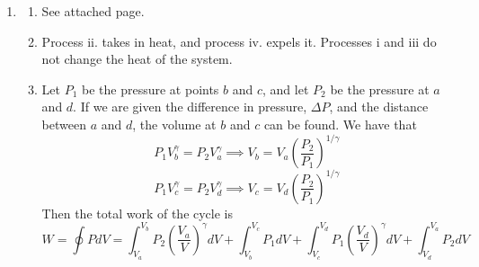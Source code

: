 \documentclass[10pt]{article}
\begin{document}
\begin{enumerate}
    \item \begin{enumerate}
        \item See attached page.

        \item Process ii. takes in heat, and process iv. expels it. Processes i and iii do not change the heat of the system.

        \item Let $P_1$ be the pressure at points $b$ and $c$, and let $P_2$ be the pressure at $a$ and $d$. If we are given the difference in pressure, $\Delta P$, and the distance between $a$ and $d$, the volume at $b$ and $c$ can be found. We have that
        \begin{equation*}
            P_1V_b^\gamma = P_2V_a^\gamma \implies V_b = V_a\left(\frac{P_2}{P_1}\right)^{1/\gamma}
        \end{equation*}
        \begin{equation*}
            P_1V_c^\gamma = P_2V_d^\gamma \implies V_c = V_d\left(\frac{P_2}{P_1}\right)^{1/\gamma}
        \end{equation*}
        Then the total work of the cycle is
        \begin{equation*}
            W = \oint P dV = \int_{V_a}^{V_b} P_2 \left(\frac{V_a}{V}\right)^\gamma dV + \int_{V_b}^{V_c} P_1 dV + \int_{V_c}^{V_d} P_1 \left(\frac{V_d}{V}\right)^\gamma dV + \int_{V_d}^{V_a} P_2 dV
        \end{equation*}
    \end{enumerate}


  \end{enumerate}
\end{document}
